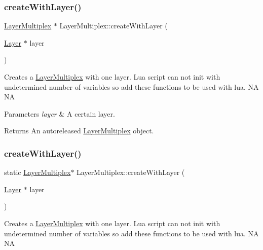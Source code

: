 \subsubsection{\texorpdfstring{create\+With\+Layer()}{createWithLayer()}\hspace{0.1cm}{\footnotesize\ttfamily [1/2]}}
{\footnotesize\ttfamily \hyperlink{classLayerMultiplex}{Layer\+Multiplex} $\ast$ Layer\+Multiplex\+::create\+With\+Layer (\begin{DoxyParamCaption}\item[{\hyperlink{classLayer}{Layer} $\ast$}]{layer }\end{DoxyParamCaption})\hspace{0.3cm}{\ttfamily [static]}}

Creates a \hyperlink{classLayerMultiplex}{Layer\+Multiplex} with one layer. Lua script can not init with undetermined number of variables so add these functions to be used with lua.  NA  NA


\begin{DoxyParams}{Parameters}
{\em layer} & A certain layer. \\
\hline
\end{DoxyParams}
\begin{DoxyReturn}{Returns}
An autoreleased \hyperlink{classLayerMultiplex}{Layer\+Multiplex} object. 
\end{DoxyReturn}
\mbox{\label{classLayerMultiplex_a33a7fdaa791d35e11a9c3537a78f4b60}} 
\subsubsection{\texorpdfstring{create\+With\+Layer()}{createWithLayer()}\hspace{0.1cm}{\footnotesize\ttfamily [2/2]}}
{\footnotesize\ttfamily static \hyperlink{classLayerMultiplex}{Layer\+Multiplex}$\ast$ Layer\+Multiplex\+::create\+With\+Layer (\begin{DoxyParamCaption}\item[{\hyperlink{classLayer}{Layer} $\ast$}]{layer }\end{DoxyParamCaption})\hspace{0.3cm}{\ttfamily [static]}}

Creates a \hyperlink{classLayerMultiplex}{Layer\+Multiplex} with one layer. Lua script can not init with undetermined number of variables so add these functions to be used with lua.  NA  NA


